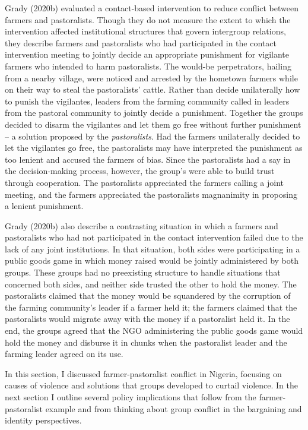 \documentclass[11pt]{article}
\begin{document}
Grady (2020b) evaluated a contact-based intervention to reduce conflict
between farmers and pastoralists. Though they do not measure the extent
to which the intervention affected institutional structures that govern
intergroup relations, they describe farmers and pastoralists who had
participated in the contact intervention meeting to jointly decide an
appropriate punishment for vigilante farmers who intended to harm
pastoralists. The would-be perpetrators, hailing from a nearby village,
were noticed and arrested by the hometown farmers while on their way to
steal the pastoralists' cattle. Rather than decide unilaterally how to
punish the vigilantes, leaders from the farming community called in
leaders from the pastoral community to jointly decide a punishment.
Together the groups decided to disarm the vigilantes and let them go
free without further punishment -- a solution proposed by the
\emph{pastoralists}. Had the farmers unilaterally decided to let the
vigilantes go free, the pastoralists may have interpreted the punishment
as too lenient and accused the farmers of bias. Since the pastoralists
had a say in the decision-making process, however, the group's were able
to build trust through cooperation. The pastoralists appreciated the
farmers calling a joint meeting, and the farmers appreciated the
pastoralists magnanimity in proposing a lenient punishment.

Grady (2020b) also describe a contrasting situation in which a farmers
and pastoralists who had not participated in the contact intervention
failed due to the lack of any joint institutions. In that situation,
both sides were participating in a public goods game in which money
raised would be jointly administered by both groups. These groups had no
preexisting structure to handle situations that concerned both sides,
and neither side trusted the other to hold the money. The pastoralists
claimed that the money would be squandered by the corruption of the
farming community's leader if a farmer held it; the farmers claimed that
the pastoralists would migrate away with the money if a pastoralist held
it. In the end, the groups agreed that the NGO administering the public
goods game would hold the money and disburse it in chunks when the
pastoralist leader and the farming leader agreed on its use.

In this section, I discussed farmer-pastoralist conflict in Nigeria,
focusing on causes of violence and solutions that groups developed to
curtail violence. In the next section I outline several policy
implications that follow from the farmer-pastoralist example and from
thinking about group conflict in the bargaining and identity
perspectives.
\end{document}
